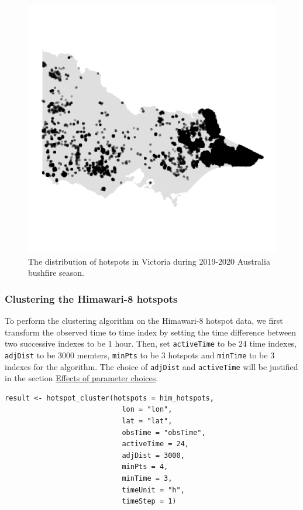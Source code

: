 \begin{Schunk}
\begin{figure}

{\centering \includegraphics[width=0.8\linewidth]{figures/before_clustering} 

}

\caption[The distribution of hotspots in Victoria during 2019-2020 Australia bushfire season]{The distribution of hotspots in Victoria during 2019-2020 Australia bushfire season.}\label{fig:hotspots}
\end{figure}
\end{Schunk}

\hypertarget{clustering-the-himawari-8-hotspots}{%
\subsubsection{Clustering the Himawari-8
hotspots}\label{clustering-the-himawari-8-hotspots}}

To perform the clustering algorithm on the Himawari-8 hotspot data, we
first transform the observed time to time index by setting the time
difference between two successive indexes to be \(1\) hour. Then, set
\texttt{activeTime} to be \(24\) time indexes, \texttt{adjDist} to be
\(3000\) memters, \texttt{minPts} to be \(3\) hotspots and
\texttt{minTime} to be \(3\) indexes for the algorithm. The choice of
\texttt{adjDist} and \texttt{activeTime} will be justified in the
section \protect\hyperlink{effects-of-parameter-choices}{Effects of
parameter choices}.

\begin{verbatim}
result <- hotspot_cluster(hotspots = him_hotspots,
                            lon = "lon",
                            lat = "lat",
                            obsTime = "obsTime",
                            activeTime = 24,
                            adjDist = 3000,
                            minPts = 4,
                            minTime = 3,
                            timeUnit = "h",
                            timeStep = 1)
\end{verbatim}


